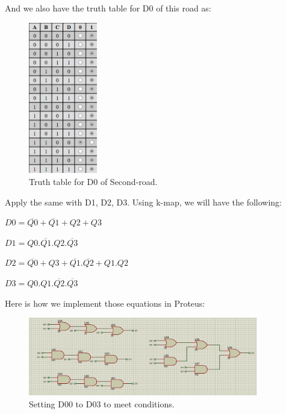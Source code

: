 \documentclass{article}
\begin{document}
And we also have the truth table for D0 of this road as: \par
\begin{figure}[h]
    \centering
    \includegraphics[width=3cm]{Pic/Proteus/Truth table D0_2.png}
    \caption{Truth table for D0 of Second-road.}
    \label{fig:enter-label}
\end{figure}

Apply the same with D1, D2, D3. Using k-map, we will have the following:\par
$D0 = \overline{Q0} + \overline{Q1} + Q2 + Q3$\par
$D1 = Q0.\overline{Q1}.Q2.\overline{Q3}$\par
$D2 = \overline{Q0} + Q3 + \overline{Q1}.\overline{Q2} + Q1.Q2$\par
$D3 = Q0.Q1.\overline{Q2}.\overline{Q3}$\par

Here is how we implement those equations in Proteus:\par
\begin{figure}[h]
    \centering
    \includegraphics[width=10cm]{Pic/Proteus/175N_Proteus_2.png}
    \caption{Setting D00 to D03 to meet conditions.}
    \label{fig:enter-label}
\end{figure}
\end{document}

